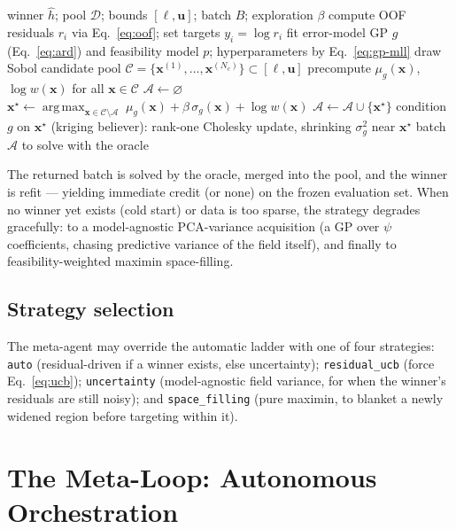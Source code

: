 \documentclass[11pt]{article}
\newcommand{\x}{\bm{x}}
\DeclareMathOperator*{\argmax}{arg\,max}
\begin{document}
\begin{algorithm}[t]
\caption{Residual-driven UCB batch acquisition}
\label{alg:acq}
\begin{algorithmic}[1]
\Require winner $\hat h$; pool $\mathcal{D}$; bounds $[\bm\ell,\bm u]$; batch $B$; exploration $\beta$
\State compute OOF residuals $r_i$ via Eq.~\eqref{eq:oof}; set targets $y_i=\log r_i$
\State fit error-model GP $g$ (Eq.~\eqref{eq:ard}) and feasibility model $p$; hyperparameters by Eq.~\eqref{eq:gp-mll}
\State draw Sobol candidate pool $\mathcal{C}=\{\x^{(1)},\dots,\x^{(N_c)}\}\subset[\bm\ell,\bm u]$
\State precompute $\mu_g(\x)$, $\log w(\x)$ for all $\x\in\mathcal{C}$
\State $\mathcal{A}\gets\varnothing$
  \State $\x^\star \gets \argmax_{\x\in\mathcal{C}\setminus\mathcal{A}}\;
         \mu_g(\x)+\beta\,\sigma_g(\x)+\log w(\x)$ 
  \State $\mathcal{A}\gets\mathcal{A}\cup\{\x^\star\}$
  \State condition $g$ on $\x^\star$ (kriging believer): rank-one Cholesky update, shrinking $\sigma_g^2$ near $\x^\star$
\EndFor
\State \Return batch $\mathcal{A}$ to solve with the oracle
\end{algorithmic}
\end{algorithm}

The returned batch is solved by the oracle, merged into the pool, and the
winner is refit --- yielding immediate credit (or none) on the frozen
evaluation set. When no winner yet exists (cold start) or data is too sparse,
the strategy degrades gracefully: to a model-agnostic PCA-variance acquisition
(a GP over $\psi$ coefficients, chasing predictive variance of the field
itself), and finally to feasibility-weighted maximin space-filling.

\subsection{Strategy selection}

The meta-agent may override the automatic ladder with one of four strategies:
\texttt{auto} (residual-driven if a winner exists, else uncertainty);
\texttt{residual\_ucb} (force Eq.~\eqref{eq:ucb}); \texttt{uncertainty}
(model-agnostic field variance, for when the winner's residuals are still
noisy); and \texttt{space\_filling} (pure maximin, to blanket a newly widened
region before targeting within it).

\section{The Meta-Loop: Autonomous Orchestration}
\label{sec:meta}
\end{document}
